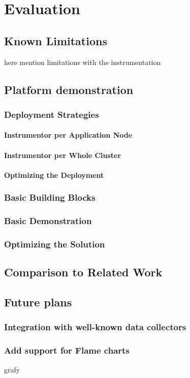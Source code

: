\chapter{Evaluation}
\label{chap:evaluation}
\section{Known Limitations}
here mention limitations with the instrumentation


\section{Platform demonstration}
\subsection{Deployment Strategies}
\subsubsection{Instrumentor per Application Node}
\subsubsection{Instrumentor per Whole Cluster}
\subsubsection{Optimizing the Deployment}
\subsection{Basic Building Blocks}
\subsection{Basic Demonstration}
\subsection{Optimizing the Solution}
\section{Comparison to Related Work}
\section{Future plans}
\subsection{Integration with well-known data collectors}
\subsection{Add support for Flame charts}
grafy